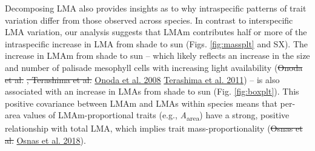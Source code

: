 \documentclass[
  12pt,
]{article}
\providecommand{\DIFaddtex}[1]{{\protect\color{blue}\uwave{#1}}} %
\providecommand{\DIFdeltex}[1]{{\protect\color{red}\sout{#1}}}                      %
\providecommand{\DIFaddbegin}{} %
\providecommand{\DIFaddend}{} %
\providecommand{\DIFdelbegin}{} %
\providecommand{\DIFdelend}{} %
\providecommand{\DIFadd}[1]{\texorpdfstring{\DIFaddtex{#1}}{#1}} %
\providecommand{\DIFdel}[1]{\texorpdfstring{\DIFdeltex{#1}}{}} %
\newcommand{\DIFscaledelfig}{0.5}
\newlength{\DIFdelgraphicswidth} %
\newlength{\DIFdelgraphicsheight} %
\newcommand{\DIFaddincludegraphics}[2][]{{\color{blue}\fbox{\DIFOincludegraphics[#1]{#2}}}} %
\newcommand{\DIFdelincludegraphics}[2][]{%
\sbox{\DIFdelgraphicsbox}{\DIFOincludegraphics[#1]{#2}}%
\settoboxwidth{\DIFdelgraphicswidth}{\DIFdelgraphicsbox} %
\settoboxtotalheight{\DIFdelgraphicsheight}{\DIFdelgraphicsbox} %
\scalebox{\DIFscaledelfig}{%
\parbox[b]{\DIFdelgraphicswidth}{\usebox{\DIFdelgraphicsbox}\\[-\baselineskip] \rule{\DIFdelgraphicswidth}{0em}}\llap{\resizebox{\DIFdelgraphicswidth}{\DIFdelgraphicsheight}{%
\setlength{\unitlength}{\DIFdelgraphicswidth}%
\begin{picture}(1,1)%
\thicklines\linethickness{2pt} %
{\color[rgb]{1,0,0}\put(0,0){\framebox(1,1){}}}%
{\color[rgb]{1,0,0}\put(0,0){\line( 1,1){1}}}%
{\color[rgb]{1,0,0}\put(0,1){\line(1,-1){1}}}%
\end{picture}%
}\hspace*{3pt}}} %
} %
\DeclareRobustCommand{\DIFaddbegin}{\DIFOaddbegin \let\includegraphics\DIFaddincludegraphics} %
\DeclareRobustCommand{\DIFaddend}{\DIFOaddend \let\includegraphics\DIFOincludegraphics} %
\DeclareRobustCommand{\DIFdelbegin}{\DIFOdelbegin \let\includegraphics\DIFdelincludegraphics} %
\DeclareRobustCommand{\DIFdelend}{\DIFOaddend \let\includegraphics\DIFOincludegraphics} %
\begin{document}
Decomposing LMA also provides insights as to why intraspecific patterns of trait variation differ from those observed across species.
In contrast to interspecific LMA variation, our analysis suggests that LMAm contributes half or more of the intraspecific increase in LMA from shade to sun (Figs. \DIFaddbegin \DIFadd{Fig.~}\DIFaddend \ref{fig:massplt} and SX).
The increase in LMAm from shade to sun -- which likely reflects an increase in the size and number of palisade mesophyll cells with increasing light availability (\DIFdelbegin \DIFdel{Onoda et al. }\DIFdelend \protect\DIFdelbegin %
\DIFdel{, Terashima et al. }\DIFdelend \DIFaddbegin \hyperlink{ref-Onoda2008}{Onoda et al. 2008}\DIFadd{, }\DIFaddend \protect\DIFdelbegin %
\DIFdelend \DIFaddbegin \hyperlink{ref-Terashima2011}{Terashima et al. 2011}\DIFaddend ) -- is also associated with an increase in LMAs from shade to sun (Fig. \DIFaddbegin \DIFadd{Fig.~}\DIFaddend \ref{fig:boxplt}).
This positive covariance between LMAm and LMAs within species means that per-area values of LMAm-proportional traits (e.g., \emph{A}\textsubscript{area}) have a strong, positive relationship with total LMA, which implies trait mass-proportionality (\DIFdelbegin \DIFdel{Osnas et al. }\DIFdelend \protect\DIFdelbegin %
\DIFdelend \DIFaddbegin \hyperlink{ref-Osnas2018}{Osnas et al. 2018}\DIFaddend ).
\end{document}
